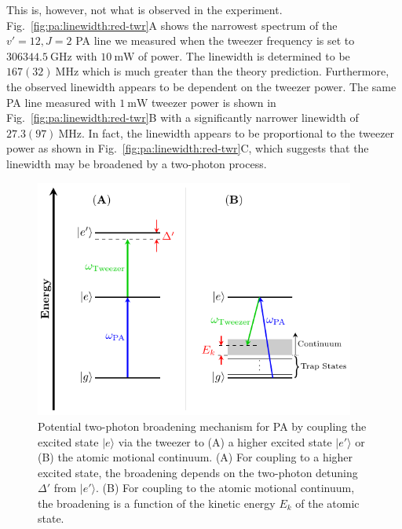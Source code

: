 This is, however, not what is observed in the experiment.
Fig.~\ref{fig:pa:linewidth:red-twr}A shows the narrowest spectrum of the $v'=12, J=2$ PA line
we measured when the tweezer frequency is set to $306344.5~\mathrm{GHz}$
with $10~\mathrm{mW}$ of power. The linewidth is determined to be $167(32)~\mathrm{MHz}$
which is much greater than the theory prediction.
Furthermore, the observed linewidth appears to be dependent on the tweezer power.
The same PA line measured with $1~\mathrm{mW}$ tweezer power
is shown in Fig.~\ref{fig:pa:linewidth:red-twr}B with a significantly narrower linewidth
of $27.3(97)~\mathrm{MHz}$.
In fact, the linewidth appears to be proportional to the tweezer power
as shown in Fig.~\ref{fig:pa:linewidth:red-twr}C,
which suggests that the linewidth may be broadened by a two-photon process.

\begin{figure}
  \centering
  \includegraphics[width=0.939\textwidth]{figures/pa_two_photon_up_vs_down.pdf}
  \caption[Two-photon broadening mechanism for PA]{
    Potential two-photon broadening mechanism for PA by coupling the excited state $|e\rangle$
    via the tweezer to (A) a higher excited state $|e'\rangle$ or
    (B) the atomic motional continuum.
    (A) For coupling to a higher excited state,
    the broadening depends on the two-photon detuning $\Delta'$ from $|e'\rangle$.
    (B) For coupling to the atomic motional continuum,
    the broadening is a function of the kinetic energy $E_k$ of the atomic state.
    \label{fig:pa:linewidth:up-vs-down}}
\end{figure}

